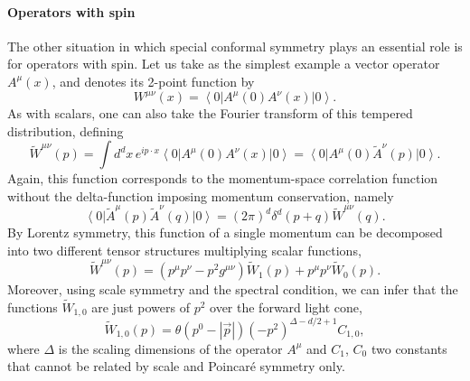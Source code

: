\documentclass[a4paper,12pt]{article}
\newcommand{\ket}[1]{\left| #1 \right\rangle}
\newcommand{\bra}[1]{\left\langle #1 \right|}
\numberwithin{equation}{section}
\begin{document}
\paragraph{Operators with spin}

The other situation in which special conformal symmetry plays an essential role is for operators with spin.
Let us take as the simplest example a vector operator $A^\mu(x)$, and denotes its 2-point function by
\begin{equation}
	W^{\mu\nu}(x) = \bra{0} A^\mu(0) A^\nu(x) \ket{0}.
\end{equation}
As with scalars, one can also take the Fourier transform of this tempered distribution, defining
\begin{equation}
	\widetilde{W}^{\mu\nu}(p) = \int d^dx \, e^{i p \cdot x}
	\bra{0} A^\mu(0) A^\nu(x) \ket{0}
	= \bra{0} A^\mu(0) \widetilde{A}^\nu(p) \ket{0}.
	\label{eq:vector:mixedrep}
\end{equation}
Again, this function corresponds to the momentum-space correlation function without the delta-function imposing momentum conservation, namely
\begin{equation}
	\bra{0} \widetilde{A}^\mu(p) \widetilde{A}^\nu(q) \ket{0}
	= (2\pi)^d \delta^d(p + q) \widetilde{W}^{\mu\nu}(q).
\end{equation}
By Lorentz symmetry, this function of a single momentum can be decomposed into two different tensor structures multiplying scalar functions,
\begin{equation}
	\widetilde{W}^{\mu\nu}(p)
	= (p^\mu p^\nu - p^2 g^{\mu\nu}) \widetilde{W}_1(p)
	+ p^\mu p^\nu \widetilde{W}_0(p).
	\label{eq:vector:polarizations}
\end{equation}
Moreover, using scale symmetry and the spectral condition, we can infer that the functions $\widetilde{W}_{1,0}$ are just powers of $p^2$ over the forward light cone,
\begin{equation}
	\widetilde{W}_{1,0}(p)
	= \theta\left( p^0 - \left| \vec{p} \right| \right)
	(-p^2)^{\Delta - d/2 + 1} C_{1,0},
\end{equation}
where $\Delta$ is the scaling dimensions of the operator $A^\mu$ and $C_1$, $C_0$ two constants that cannot be related by scale and Poincaré symmetry only.
\end{document}
